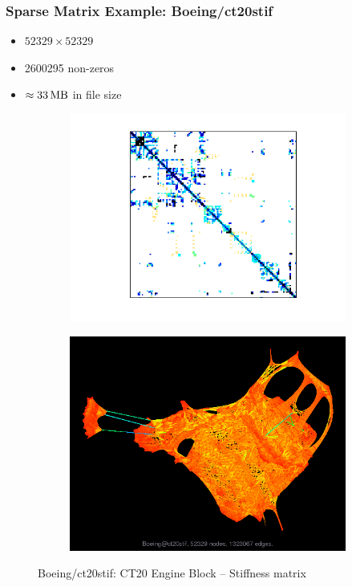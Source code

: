\documentclass[t,12pt,numbers,fleqn]{beamer}
\begin{document}
\begin{frame}
\frametitle{Sparse Matrix Example: Boeing/ct20stif}

\begin{itemize}
\item \(\num{52329} \times \num{52329}\)
\item \num{2600295} non-zeros
\item \(\approx \SI{33}{\mega\byte}\) in file size
\end{itemize}

\begin{figure}[h]
  \centering
  \begin{subfigure}[b]{0.5\textwidth}
    \centering
    \includegraphics[width=\textwidth,trim={2cm 1.5cm 2cm 1cm},clip]{figures/ct20stif}
  \end{subfigure}
  \begin{subfigure}[b]{0.4\textwidth}
    \centering
    \includegraphics[width=\textwidth]{figures/ct20stif_graph}
  \end{subfigure}
  \caption*{Boeing/ct20stif: CT20 Engine Block -- Stiffness
    matrix}
  \label{fig:ct20}
\end{figure}

\end{frame}
\end{document}
